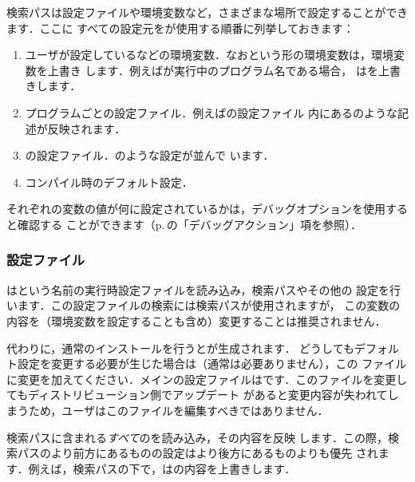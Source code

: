 \documentclass[uplatex,dvipdfmx]{jsarticle}
\begin{document}
検索パスは設定ファイルや環境変数など，さまざまな場所で設定することができます．ここに
すべての設定元を\KPS が使用する順番に列挙しておきます：
%
\begin{enumerate}
\item ユーザが設定しているなどの環境変数．なおという形の環境変数は，環境変数を上書き
  します．例えばが実行中のプログラム名である場合，%
  はを上書きします．
\item プログラムごとの設定ファイル．例えばの設定ファイル%
  内にあるのような記述が反映されます．
\item \KPS の設定ファイル．のような設定が並んで
  います．
\item コンパイル時のデフォルト設定．
\end{enumerate}
%
それぞれの変数の値が何に設定されているかは，デバッグオプションを使用すると確認する
ことができます（p.\,\pageref{sec:debugging}の「デバッグアクション」項を参照）．

\subsubsection{設定ファイル}

\KPS はという名前の実行時設定ファイルを読み込み，検索パスやその他の
設定を行います．この設定ファイルの検索には検索パスが使用されますが，
この変数の内容を（環境変数を設定することも含め）変更することは推奨されません．

代わりに，通常のインストールを行うとが生成されます．
どうしてもデフォルト設定を変更する必要が生じた場合は（通常は必要ありません），この
ファイルに変更を加えてください．メインの設定ファイルはです．このファイルを変更してもディストリビューション側でアップデート
があると変更内容が失われてしまうため，ユーザはこのファイルを編集すべきではありません．

\KPS 検索パスに含まれる\emph{すべて}のを読み込み，その内容を反映
します．この際，検索パスのより前方にあるものの設定はより後方にあるものよりも優先
されます．例えば，検索パスの下で，はの内容を上書きします．
\end{document}
